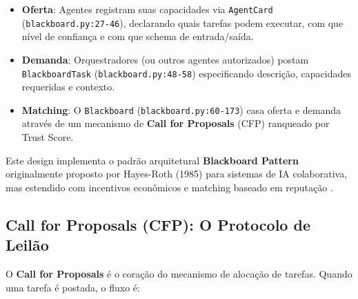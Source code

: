 \begin{itemize}
    \item \textbf{Oferta}: Agentes registram suas capacidades via \texttt{AgentCard} (\texttt{blackboard.py:27-46}), declarando quais tarefas podem executar, com que nível de confiança e com que schema de entrada/saída.
    
    \item \textbf{Demanda}: Orquestradores (ou outros agentes autorizados) postam \texttt{BlackboardTask} (\texttt{blackboard.py:48-58}) especificando descrição, capacidades requeridas e contexto.
    
    \item \textbf{Matching}: O \texttt{Blackboard} (\texttt{blackboard.py:60-173}) casa oferta e demanda através de um mecanismo de \textbf{Call for Proposals} (CFP) ranqueado por Trust Score.
\end{itemize}

Este design implementa o padrão arquitetural \textbf{Blackboard Pattern} originalmente proposto por Hayes-Roth (1985) para sistemas de IA colaborativa, mas estendido com incentivos econômicos e matching baseado em reputação \cite{hayes1985blackboard}.

\subsection{Call for Proposals (CFP): O Protocolo de Leilão}

O \textbf{Call for Proposals} é o coração do mecanismo de alocação de tarefas. Quando uma tarefa é postada, o fluxo é:

